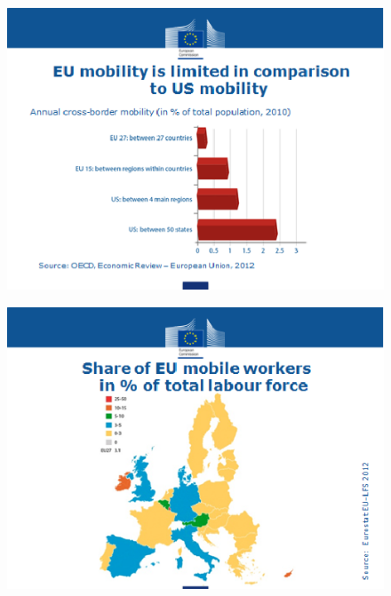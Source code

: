 \documentclass{beamer}
\begin{document}
\begin{frame}
  \begin{figure}
    \includegraphics[scale=.7]{eu_labour.eps}
  \end{figure}
\end{frame}

\begin{frame}
  \begin{figure}
    \includegraphics[scale=.7]{eu_labour2.eps}
  \end{figure}
\end{frame}
\end{document}
